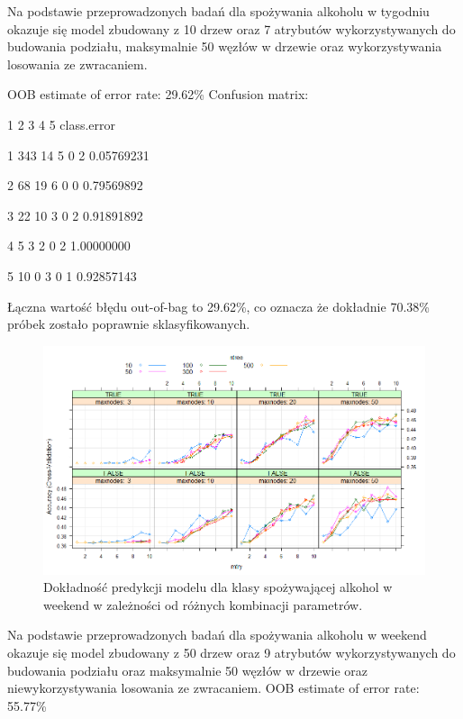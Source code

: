 
Na podstawie przeprowadzonych badań dla spożywania alkoholu w tygodniu okazuje się model zbudowany z 10 drzew oraz 7 atrybutów wykorzystywanych do  budowania podziału, maksymalnie 50 węzłów w drzewie oraz wykorzystywania losowania ze zwracaniem.


 OOB estimate of  error rate: 29.62\%
 Confusion matrix:
 
   1  2 3 4 5   class.error
   
 1 343 14 5 0 2  0.05769231
 
 2  68 19 6 0 0  0.79569892
 
 3  22 10 3 0 2  0.91891892
 
 4   5  3 2 0 2  1.00000000
 
 
 5  10  0 3 0 1  0.92857143

Łączna wartość błędu out-of-bag to 29.62\%, co oznacza że dokładnie 70.38\% próbek zostało poprawnie sklasyfikowanych. 

\begin{figure}[h]
     \centering 
     \includegraphics[scale=0.60]{tex/customW_vol4.png}
     \caption{Dokładność predykcji modelu dla klasy spożywającej alkohol w weekend w zależności od różnych kombinacji parametrów.}
     \label{fig:classes}
\end{figure}



Na podstawie przeprowadzonych badań dla spożywania alkoholu w weekend okazuje się model zbudowany z 50 drzew oraz 9 atrybutów wykorzystywanych do  budowania podziału oraz maksymalnie 50 węzłów w drzewie oraz niewykorzystywania losowania ze zwracaniem.
 OOB estimate of  error rate: 55.77\%
 
